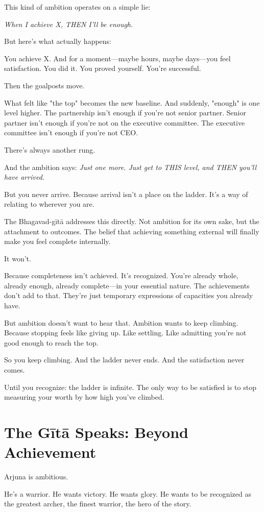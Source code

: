 \documentclass[11pt,twoside]{book}
\begin{document}
This kind of ambition operates on a simple lie:

\emph{When I achieve X, THEN I'll be enough.}

But here's what actually happens:

You achieve X. And for a moment—maybe hours, maybe days—you feel satisfaction. You did it. You proved yourself. You're successful.

Then the goalposts move.

What felt like "the top" becomes the new baseline. And suddenly, "enough" is one level higher. The partnership isn't enough if you're not senior partner. Senior partner isn't enough if you're not on the executive committee. The executive committee isn't enough if you're not CEO.

There's always another rung.

And the ambition says: \emph{Just one more. Just get to THIS level, and THEN you'll have arrived.}

But you never arrive. Because arrival isn't a place on the ladder. It's a way of relating to wherever you are.

The Bhagavad-gītā addresses this directly. Not ambition for its own sake, but the attachment to outcomes. The belief that achieving something external will finally make you feel complete internally.

It won't.

Because completeness isn't achieved. It's recognized. You're already whole, already enough, already complete—in your essential nature. The achievements don't add to that. They're just temporary expressions of capacities you already have.

But ambition doesn't want to hear that. Ambition wants to keep climbing. Because stopping feels like giving up. Like settling. Like admitting you're not good enough to reach the top.

So you keep climbing. And the ladder never ends. And the satisfaction never comes.

Until you recognize: the ladder is infinite. The only way to be satisfied is to stop measuring your worth by how high you've climbed.

\section*{The Gītā Speaks: Beyond Achievement}

Arjuna is ambitious.

He's a warrior. He wants victory. He wants glory. He wants to be recognized as the greatest archer, the finest warrior, the hero of the story.
\end{document}

